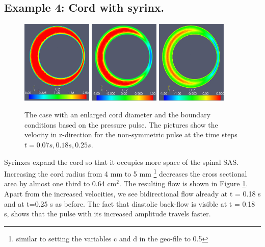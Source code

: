 \subsection{Example 4: Cord with syrinx.}
\begin{figure}\begin{center}
\includegraphics[width=0.3\textwidth]{chapters/hentschel/pdf/pulse_syrinx_f1_08_syrinx05_sysmax_nmb7.pdf}
\includegraphics[width=0.3\textwidth]{chapters/hentschel/pdf/pulse_syrinx_f1_08_syrinx05_sysdia_nmb18.pdf}
\includegraphics[width=0.3\textwidth]{chapters/hentschel/pdf/pulse_syrinx_f1_08_syrinx05_diamin1_nmb25.pdf}
\caption{The case with an enlarged cord diameter and the boundary
    conditions based on the pressure pulse. The pictures show the velocity in z-direction for the non-symmetric pulse at the time steps $t=0.07s, 0.18s, 0.25s$.}
\label{fig:case4}
\end{center}\end{figure}

Syrinxes expand the cord so that it occupies more space of the spinal SAS. Increasing the cord radius from 4 mm to 5 mm \footnote{similar to setting the variables c and d in the geo-file to 0.5} decreases the cross sectional area by almost one third to 0.64 $\mathrm{cm^2}$. The resulting flow is shown in Figure \ref{fig:case4}. Apart from the increased velocities, we see bidirectional flow already at t = 0.18 s and at t=0.25 s as before. The fact that diastolic back-flow is visible at t = 0.18 s, shows that the pulse with its increased amplitude travels faster.

